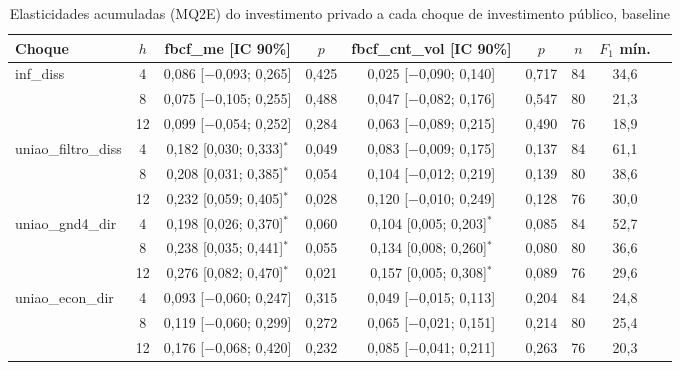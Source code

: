 \begin{table}[htbp]
\centering
\caption{Elasticidades acumuladas (MQ2E) do investimento privado a cada choque de investimento p\'ublico, baseline}
\label{tab:a6_lp_elast}
\scriptsize
\begin{adjustbox}{max width=\linewidth}
\begin{tabular}{lcccccccc}
\toprule
Choque & $h$ & fbcf\_me [IC 90\%] & $p$ & fbcf\_cnt\_vol [IC 90\%] & $p$ & $n$ & $F_1$ m\'in. \\
\midrule
inf\_diss & 4 & 0{,}086 [$-$0{,}093; 0{,}265] & 0{,}425 & 0{,}025 [$-$0{,}090; 0{,}140] & 0{,}717 & 84 & 34{,}6 \\
 & 8 & 0{,}075 [$-$0{,}105; 0{,}255] & 0{,}488 & 0{,}047 [$-$0{,}082; 0{,}176] & 0{,}547 & 80 & 21{,}3 \\
 & 12 & 0{,}099 [$-$0{,}054; 0{,}252] & 0{,}284 & 0{,}063 [$-$0{,}089; 0{,}215] & 0{,}490 & 76 & 18{,}9 \\
uniao\_filtro\_diss & 4 & 0{,}182 [0{,}030; 0{,}333]$^{*}$ & 0{,}049 & 0{,}083 [$-$0{,}009; 0{,}175] & 0{,}137 & 84 & 61{,}1 \\
 & 8 & 0{,}208 [0{,}031; 0{,}385]$^{*}$ & 0{,}054 & 0{,}104 [$-$0{,}012; 0{,}219] & 0{,}139 & 80 & 38{,}6 \\
 & 12 & 0{,}232 [0{,}059; 0{,}405]$^{*}$ & 0{,}028 & 0{,}120 [$-$0{,}010; 0{,}249] & 0{,}128 & 76 & 30{,}0 \\
uniao\_gnd4\_dir & 4 & 0{,}198 [0{,}026; 0{,}370]$^{*}$ & 0{,}060 & 0{,}104 [0{,}005; 0{,}203]$^{*}$ & 0{,}085 & 84 & 52{,}7 \\
 & 8 & 0{,}238 [0{,}035; 0{,}441]$^{*}$ & 0{,}055 & 0{,}134 [0{,}008; 0{,}260]$^{*}$ & 0{,}080 & 80 & 36{,}6 \\
 & 12 & 0{,}276 [0{,}082; 0{,}470]$^{*}$ & 0{,}021 & 0{,}157 [0{,}005; 0{,}308]$^{*}$ & 0{,}089 & 76 & 29{,}6 \\
uniao\_econ\_dir & 4 & 0{,}093 [$-$0{,}060; 0{,}247] & 0{,}315 & 0{,}049 [$-$0{,}015; 0{,}113] & 0{,}204 & 84 & 24{,}8 \\
 & 8 & 0{,}119 [$-$0{,}060; 0{,}299] & 0{,}272 & 0{,}065 [$-$0{,}021; 0{,}151] & 0{,}214 & 80 & 25{,}4 \\
 & 12 & 0{,}176 [$-$0{,}068; 0{,}420] & 0{,}232 & 0{,}085 [$-$0{,}041; 0{,}211] & 0{,}263 & 76 & 20{,}3 \\

\end{tabular}
\end{adjustbox}
\end{table}
